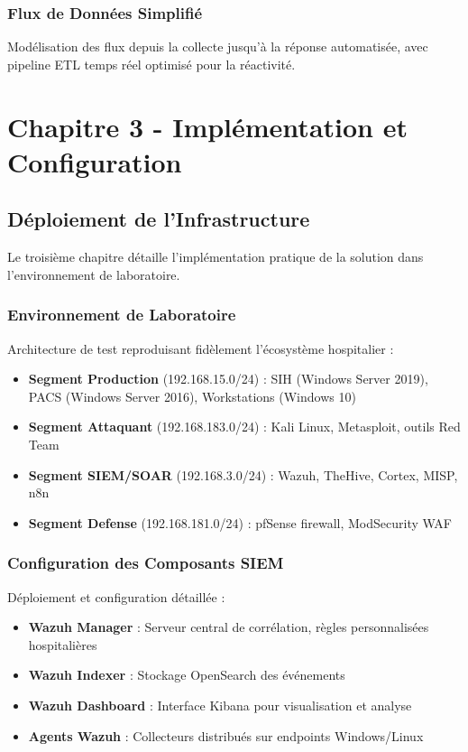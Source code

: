 \subsubsection{Flux de Données Simplifié}
Modélisation des flux depuis la collecte jusqu'à la réponse automatisée, avec pipeline ETL temps réel optimisé pour la réactivité.

\section{Chapitre 3 - Implémentation et Configuration}

\subsection{Déploiement de l'Infrastructure}

Le troisième chapitre détaille l'implémentation pratique de la solution dans l'environnement de laboratoire.

\subsubsection{Environnement de Laboratoire}
Architecture de test reproduisant fidèlement l'écosystème hospitalier :
\begin{itemize}
    \item \textbf{Segment Production} (192.168.15.0/24) : SIH (Windows Server 2019), PACS (Windows Server 2016), Workstations (Windows 10)
    \item \textbf{Segment Attaquant} (192.168.183.0/24) : Kali Linux, Metasploit, outils Red Team
    \item \textbf{Segment SIEM/SOAR} (192.168.3.0/24) : Wazuh, TheHive, Cortex, MISP, n8n
    \item \textbf{Segment Defense} (192.168.181.0/24) : pfSense firewall, ModSecurity WAF
\end{itemize}

\subsubsection{Configuration des Composants SIEM}
Déploiement et configuration détaillée :
\begin{itemize}
    \item \textbf{Wazuh Manager} : Serveur central de corrélation, règles personnalisées hospitalières
    \item \textbf{Wazuh Indexer} : Stockage OpenSearch des événements
    \item \textbf{Wazuh Dashboard} : Interface Kibana pour visualisation et analyse
    \item \textbf{Agents Wazuh} : Collecteurs distribués sur endpoints Windows/Linux
\end{itemize}

